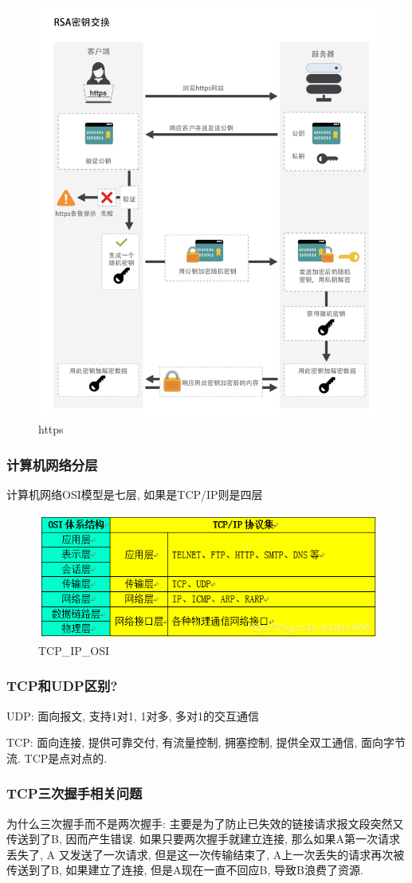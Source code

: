 \documentclass[UTF8]{ctexart}
\begin{document}
\begin{figure}
	\centering
	\includegraphics[width=0.7\linewidth]{figures/https.png}
	\caption{https}
	\label{fig:https}
\end{figure}

\subsubsection{计算机网络分层}
计算机网络OSI模型是七层, 如果是TCP/IP则是四层
\begin{figure}
	\centering
	\includegraphics[width=0.7\linewidth]{figures/TCP_IP_OSI.png}
	\caption{TCP\_IP\_OSI}
	\label{fig:TCP_IP_OSI}
\end{figure}
\subsubsection{TCP和UDP区别?}
\par
UDP: 面向报文, 支持1对1, 1对多, 多对1的交互通信
\par
TCP: 面向连接, 提供可靠交付, 有流量控制, 拥塞控制, 提供全双工通信, 面向字节流. TCP是点对点的.
\subsubsection{TCP三次握手相关问题}
为什么三次握手而不是两次握手: 主要是为了防止已失效的链接请求报文段突然又传送到了B, 因而产生错误. 如果只要两次握手就建立连接, 那么如果A第一次请求丢失了, A 又发送了一次请求, 但是这一次传输结束了, A上一次丢失的请求再次被传送到了B, 如果建立了连接, 但是A现在一直不回应B, 导致B浪费了资源.
\end{document}

